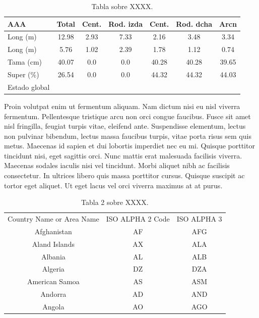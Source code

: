 \begin{table}[ht]
  \centering
  \caption{Tabla sobre XXXX.}
  \label{tab:Dam}
  \footnotesize\sffamily
  \begin{tabular}{|l|c|c|c|c|c|c|}
\hline
    \textbf{AAA} & Total & \cellcolor{codegreen!50}Cent. & \cellcolor{codegreen!50}Rod. izda & \cellcolor{gray!50}Cent.  & \cellcolor{gray!50}Rod. dcha & \cellcolor{gray!50}Arcn \\
    \hline
   \cellcolor{gray!50} Long (m) & 12.98 & 2.93 & 7.33 & 2.16 & 3.48 &  3.34 \\
    \hline
    \cellcolor{gray!50} Long (m) & 5.76 & 1.02 & 2.39 & 1.78 & 1.12 &  0.74\\
    \hline
    \cellcolor{gray!50} Tama (cm) & 40.07 & 0.0 & 0.0 & 40.28 & 40.28 &  39.65 \\
    \hline
    \cellcolor{gray!50} Super (\%) & 26.54 & 0.0 & 0.0 & 44.32 & 44.32 &  44.03 \\
    \hline
   \cellcolor{gray!50} Estado global & \cellcolor{codegreen!60}  &  \cellcolor{blue!60}& \cellcolor{codegreen!60}&\cellcolor{yellow!60} &\cellcolor{codegreen!60}& \cellcolor{codegreen!60} \\
        \hline
  \end{tabular}
\end{table}

Proin volutpat enim ut fermentum aliquam. Nam dictum nisi eu nisl viverra fermentum. Pellentesque tristique arcu non orci congue faucibus. Fusce sit amet nisl fringilla, feugiat turpis vitae, eleifend ante. Suspendisse elementum, lectus non pulvinar bibendum, lectus massa faucibus turpis, vitae porta risus sem quis metus. Maecenas id sapien et dui lobortis imperdiet nec eu mi. Quisque porttitor tincidunt nisi, eget sagittis orci. Nunc mattis erat malesuada facilisis viverra. Maecenas sodales iaculis nisi vel tincidunt. Morbi aliquet nibh ac facilisis consectetur. In ultrices libero quis massa porttitor cursus. Quisque suscipit ac tortor eget aliquet. Ut eget lacus vel orci viverra maximus at at purus.

\begin{table}[ht]
  \centering
  \caption{Tabla 2 sobre XXXX.}
  \label{tab:Dam2}
  \footnotesize\sffamily
\begin{tabular}{ |c|c|c|  }
\hline
\rowcolor{lightgray} \multicolumn{3}{|c|}{Country List} \\
\hline
Country Name     or Area Name& ISO ALPHA 2 Code &ISO ALPHA 3 \\
\hline
Afghanistan & AF &AFG \\
\rowcolor{gray}
Aland Islands & AX  & ALA \\
Albania    &AL & ALB \\
Algeria   &DZ & DZA \\
American Samoa & AS & ASM \\
Andorra & AD & \cellcolor[HTML]{AA0044} AND \\
Angola & AO & AGO \\
\hline
\end{tabular}
\end{table}

